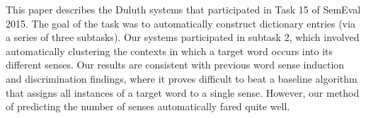 This paper describes the Duluth systems that participated in Task 15 of SemEval 2015. The goal of the task was to automatically construct dictionary entries (via a series of three subtasks). Our systems participated in subtask 2, which involved automatically clustering the contexts in which a target word occurs into its different senses. Our results are consistent with previous word sense induction and discrimination findings, where it proves difficult to beat a baseline algorithm that assigns all instances of a target word to a single sense. However, our method of predicting the number of senses automatically fared quite well.
